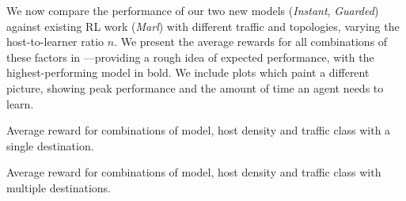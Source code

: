 \documentclass[10pt, times, conference, letterpaper]{IEEEtran}
\begin{document}
We now compare the performance of our two new models (\emph{Instant}, \emph{Guarded}) against existing RL work (\emph{Marl}) with different traffic and topologies, varying the host-to-learner ratio $n$.
We present the average rewards for all combinations of these factors in ---providing a rough idea of expected performance, with the highest-performing model in bold.
We include plots which paint a different picture, showing peak performance and the amount of time an agent needs to learn.

\begin{table}
	\centering
	\caption{Average reward for combinations of model, host density and traffic class with a single destination.\label{tab:av-vals}}
	
\vspace{-1em}
\end{table}
\begin{table}
	\centering
	\caption{Average reward for combinations of model, host density and traffic class with multiple destinations.\label{tab:av-ecmp-vals}}
	
\vspace{-1em}
\end{table}
\end{document}
